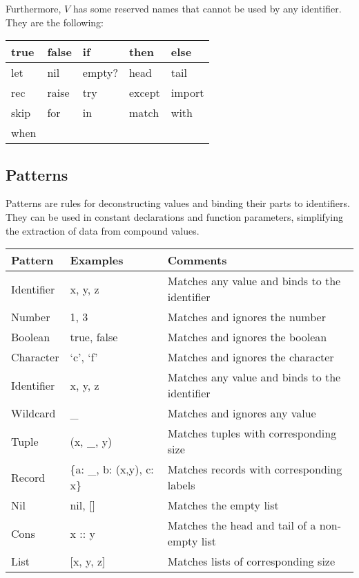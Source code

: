 \documentclass{article}
\begin{document}
Furthermore, $V$ has some reserved names that cannot be used by any identifier.
They are the following:

\medskip

\begin{tabular}{|l|l|l|l|l|}
  \hline
  true & false & if & then & else\\
  \hline
  let & nil & empty? & head & tail\\
  \hline
  rec & raise & try & except & import\\
  \hline
  skip & for & in & match & with\\
  \hline
  when\\
  \hline
\end{tabular}

\subsection{Patterns}

Patterns are rules for deconstructing values and binding their parts to identifiers.
They can be used in constant declarations and function parameters, simplifying the extraction of data from compound values.

\medskip

\begin{tabular}{|l|l|l|}
  \hline
  \textbf{Pattern} & \textbf{Examples} & \textbf{Comments}\\
  \hline
  Identifier & x, y, z & Matches any value and binds to the identifier\\
  \hline
  Number & 1, 3 & Matches and ignores the number\\
  \hline
  Boolean & true, false & Matches and ignores the boolean\\
  \hline
  Character & `c', `f' & Matches and ignores the character\\
  \hline
  Identifier & x, y, z & Matches any value and binds to the identifier\\
  \hline
  Wildcard & _ & Matches and ignores any value\\
  \hline
  Tuple & (x, _, y) & Matches tuples with corresponding size\\
  \hline
  Record & \{a: _, b: (x,y), c: x\} & Matches records with corresponding labels\\
  \hline
  Nil & nil, [] & Matches the empty list\\
  \hline
  Cons & x :: y & Matches the head and tail of a non-empty list\\
  \hline
  List & [x, y, z] & Matches lists of corresponding size\\
  \hline
\end{tabular}
\end{document}
